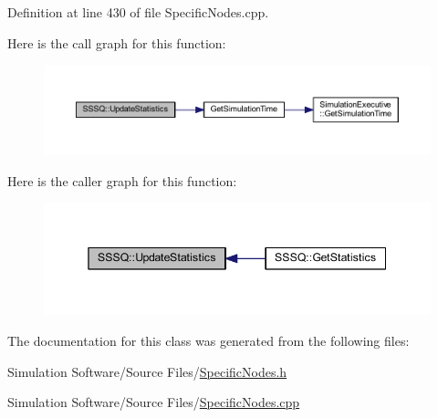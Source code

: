 Definition at line 430 of file Specific\+Nodes.\+cpp.

Here is the call graph for this function\+:
\nopagebreak
\begin{figure}[H]
\begin{center}
\leavevmode
\includegraphics[width=350pt]{class_s_s_s_q_a8d3666772548e12aa39484d22ab5635c_cgraph}
\end{center}
\end{figure}
Here is the caller graph for this function\+:
\nopagebreak
\begin{figure}[H]
\begin{center}
\leavevmode
\includegraphics[width=345pt]{class_s_s_s_q_a8d3666772548e12aa39484d22ab5635c_icgraph}
\end{center}
\end{figure}


The documentation for this class was generated from the following files\+:\begin{DoxyCompactItemize}
\item 
Simulation Software/\+Source Files/\hyperlink{_specific_nodes_8h}{Specific\+Nodes.\+h}\item 
Simulation Software/\+Source Files/\hyperlink{_specific_nodes_8cpp}{Specific\+Nodes.\+cpp}\end{DoxyCompactItemize}
